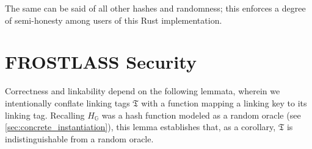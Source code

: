 \documentclass[11pt]{article}
\theoremstyle{definition}
\newcommand{\G}{\mathbb{G}}
\newcommand{\tlt}{\texttt{tlt}}
\newcommand{\ring}{\texttt{ring}}
\newcommand{\VK}{\underline{\texttt{vk}}}
\newcommand{\seed}{\texttt{seed}}
\newcommand{\msg}{\texttt{msg}}
\begin{document}
\begin{itemize}

\end{itemize}



The same can be said of all other hashes and randomness; this enforces a degree of semi-honesty among users of this Rust implementation.




\section{FROSTLASS Security}


Correctness and linkability depend on the following lemmata, wherein we intentionally conflate linking tags $\mathfrak{T}$ with a function mapping a linking key to its linking tag. Recalling $H_{\G}$ was a hash function modeled as a random oracle (see \cref{sec:concrete_instantiation}), this lemma establishes that, as a corollary, $\mathfrak{T}$ is indistinguishable from a random oracle.
\end{document}
